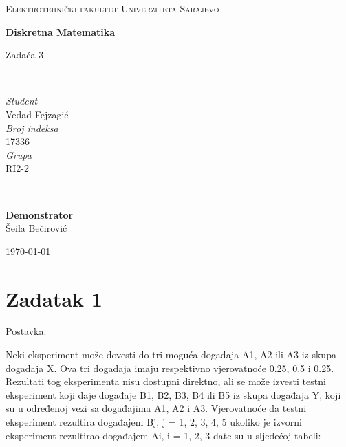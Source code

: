 \documentclass[12pt]{article}
\begin{document}
\begin{titlepage}
	\newcommand{\HRule}{\rule{\linewidth}{0.5mm}}
	
	\center
	
	\textsc{\Large Elektrotehnički fakultet Univerziteta Sarajevo}\\[4cm]
	
	{\huge\bfseries Diskretna Matematika\vspace{5mm}

 	Zadaća 3}\\[4.5cm]

	\begin{minipage}{0.4\textwidth}
		\begin{flushleft}
			\large
			\textit{Student}\\
			Vedad Fejzagić\\[5mm]
			\textit{Broj indeksa}\\
			17336\\[5mm]
			\textit{Grupa}\\
			RI2-2
		\end{flushleft}
	\end{minipage}
	~
	\begin{minipage}{0.4\textwidth}
		\begin{flushright}
			\large
			\textbf{Demonstrator}\\
			\hspace{10mm}Šeila Bečirović
		\end{flushright}
	\end{minipage}
	
	\vfill\vfill\vfill
	
	{\large\today}
	
	\vfill
	
\end{titlepage}


\newpage
\section*{Zadatak 1\label{Z1}}

\underline{Postavka:}

Neki eksperiment može dovesti do tri moguća događaja A1, A2 ili A3 iz skupa događaja X. Ova tri događaja imaju respektivno vjerovatnoće 0.25, 0.5 i 0.25. Rezultati tog eksperimenta nisu dostupni direktno, ali se može izvesti testni eksperiment koji daje događaje B1, B2, B3, B4 ili B5 iz skupa događaja Y, koji su u određenoj vezi sa događajima A1, A2 i A3. Vjerovatnoće da testni eksperiment rezultira događajem Bj, j = 1, 2, 3, 4, 5 ukoliko je izvorni eksperiment rezultirao događajem Ai, i = 1, 2, 3 date su u sljedećoj tabeli: 
\end{document}
